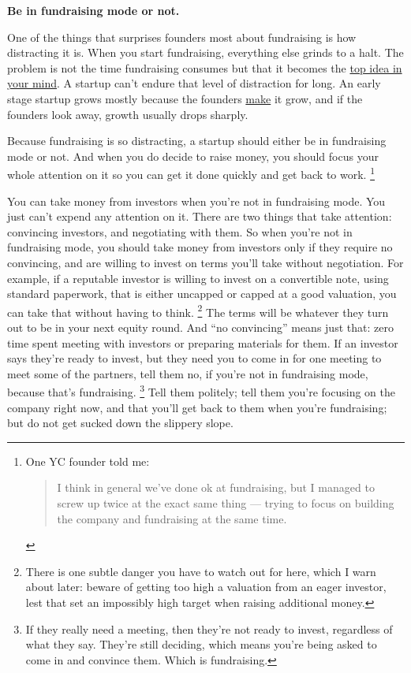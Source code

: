 \textbf{Be in fundraising mode or not.}

One of the things that surprises founders most about fundraising is how
distracting it is. When you start fundraising, everything else grinds to
a halt. The problem is not the time fundraising consumes but that it
becomes the \href{top.html}{top idea in your mind}. A startup can't
endure that level of distraction for long. An early stage startup grows
mostly because the founders \href{ds.html}{make} it grow, and if the
founders look away, growth usually drops sharply.

Because fundraising is so distracting, a startup should either be in
fundraising mode or not. And when you do decide to raise money, you
should focus your whole attention on it so you can get it done quickly
and get back to work. \footnote{One YC founder told me:

\begin{quote}
I think in general we've done ok at fundraising, but I managed to screw
up twice at the exact same thing --- trying to focus on building the
company and fundraising at the same time.
\end{quote}}

You can take money from investors when you're not in fundraising mode.
You just can't expend any attention on it. There are two things that
take attention: convincing investors, and negotiating with them. So when
you're not in fundraising mode, you should take money from investors
only if they require no convincing, and are willing to invest on terms
you'll take without negotiation. For example, if a reputable investor is
willing to invest on a convertible note, using standard paperwork, that
is either uncapped or capped at a good valuation, you can take that
without having to think. \footnote{There is one subtle danger you have to watch out for here, which
I warn about later: beware of getting too high a valuation from an eager
investor, lest that set an impossibly high target when raising
additional money.} The terms will be
whatever they turn out to be in your next equity round. And ``no
convincing'' means just that: zero time spent meeting with investors or
preparing materials for them. If an investor says they're ready to
invest, but they need you to come in for one meeting to meet some of the
partners, tell them no, if you're not in fundraising mode, because
that's fundraising. \footnote{If they really need a meeting, then they're not ready to invest,
regardless of what they say. They're still deciding, which means you're
being asked to come in and convince them. Which is fundraising.} Tell them politely; tell
them you're focusing on the company right now, and that you'll get back
to them when you're fundraising; but do not get sucked down the slippery
slope.

